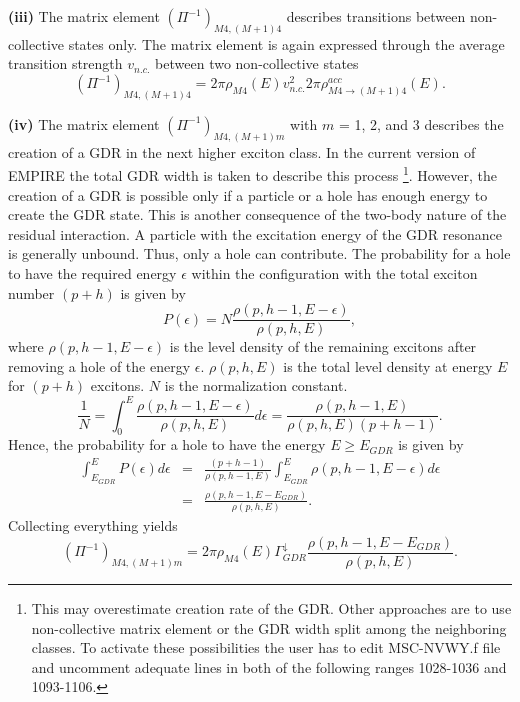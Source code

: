 \documentclass[twocolumn,amsmath,amssymb,10pt,groupedaddress,letter]{revtex4}
\begin{document}
\smallskip
\textbf{(iii)} The matrix element $(\Pi^{-1})_{M4,(M+1)4}$ describes
transitions between non-collective states only. The matrix element
is again expressed through the average transition strength $v_{n.c.}$
between two non-collective states \begin{equation}
(\Pi^{-1})_{M4,(M+1)4}=2\pi\rho_{M4}(E)v_{n.c.}^{2}2\pi\rho_{M4\rightarrow(M+1)4}^{acc}(E).\end{equation}

\smallskip
\textbf{(iv)} The matrix element $(\Pi^{-1})_{M4,(M+1)m}$ with $m$
= 1, 2, and 3 describes the creation of a GDR in the next higher exciton
class. In the current version of EMPIRE the total GDR width is taken
to describe this process%
\footnote{This may overestimate creation rate of the GDR. Other approaches are
to use non-collective matrix element or the GDR width split among
the neighboring classes. To activate these possibilities the user
has to edit MSC-NVWY.f file and uncomment
adequate lines in both of the following ranges 1028-1036 and 1093-1106.%
}. However, the creation of a GDR is possible only if a particle or
a hole has enough energy to create the GDR state. This is another
consequence of the two-body nature of the residual interaction. A
particle with the excitation energy of the GDR resonance is generally
unbound. Thus, only a hole can contribute. The probability for a hole
to have the required energy $\epsilon$ within the configuration with
the total exciton number $(p+h)$ is given by \begin{equation}
P(\epsilon)=N\frac{\rho(p,h-1,E-\epsilon)}{\rho(p,h,E)},\end{equation}
where $\rho(p,h-1,E-\epsilon)$ is the level density
of the remaining excitons after removing a hole of the energy $\epsilon$.
$\rho(p,h,E)$ is the total level density at energy $E$ for $(p+h)$
excitons. $N$ is the normalization constant. \begin{equation}
\frac{1}{N}=\int_{0}^{E}\frac{\rho(p,h-1,E-\epsilon)}{\rho(p,h,E)}d\epsilon=\frac{\rho(p,h-1,E)}{\rho(p,h,E)(p+h-1)}.\end{equation}
Hence, the probability for a hole to have the energy $E\geq E_{GDR}$
is given by \begin{eqnarray}
\int_{E_{GDR}}^{E}P(\epsilon)d\epsilon & = & \frac{(p+h-1)}{\rho(p,h-1,E)}\int_{E_{GDR}}^{E}\rho(p,h-1,E-\epsilon)d\epsilon\nonumber \\
 & = & \frac{\rho(p,h-1,E-E_{GDR})}{\rho(p,h,E)}.\end{eqnarray}
Collecting everything yields \begin{equation}
(\Pi^{-1})_{M4,(M+1)m}=2\pi\rho_{M4}(E)\Gamma_{GDR}^{\downarrow}\frac{\rho(p,h-1,E-E_{GDR})}{\rho(p,h,E)}.\end{equation}
\end{document}

